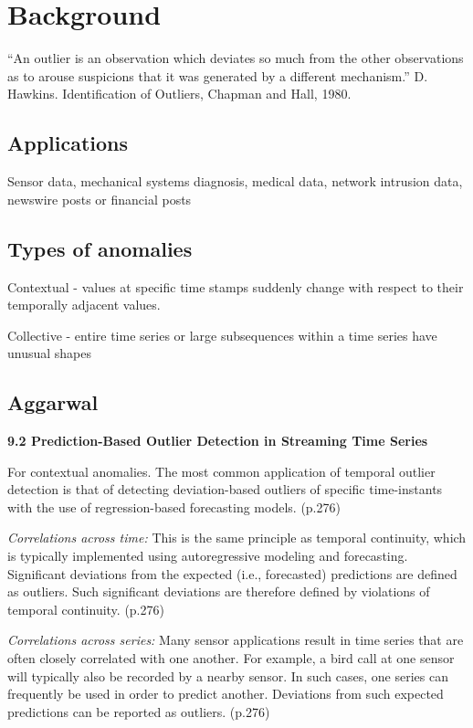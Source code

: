 \section{Background}

“An outlier is an observation which deviates so much from the other observations as to arouse suspicions that it was generated by a different mechanism.” D. Hawkins. Identification of Outliers, Chapman and Hall, 1980.

\subsection{Applications}
Sensor data, mechanical systems diagnosis, medical data, network intrusion data, newswire posts or financial posts

\subsection{Types of anomalies}

Contextual - values at specific time stamps suddenly change with respect to their temporally adjacent values. 

Collective - entire time series or large subsequences within a time series have unusual shapes \cite{Aggarwal2013a}

\subsection{Aggarwal}

\textbf{9.2 Prediction-Based Outlier Detection in Streaming Time Series}

For contextual anomalies. The most common application of temporal outlier detection is that of detecting deviation-based outliers of specific time-instants with the use of regression-based forecasting models.  (p.276)

\textit{Correlations across time:} This is the same principle as temporal continuity, which is typically implemented using autoregressive modeling and forecasting. Significant deviations from the expected (i.e., forecasted) predictions are defined as outliers. Such significant deviations are therefore defined by violations of temporal continuity. (p.276)

\textit{Correlations across series:} Many sensor applications result in time series that are often closely correlated with one another. For example, a bird call at one sensor will typically also be recorded by a nearby sensor. In such cases, one series can frequently be used in order to predict another. Deviations from such expected predictions can be reported as outliers. (p.276)

